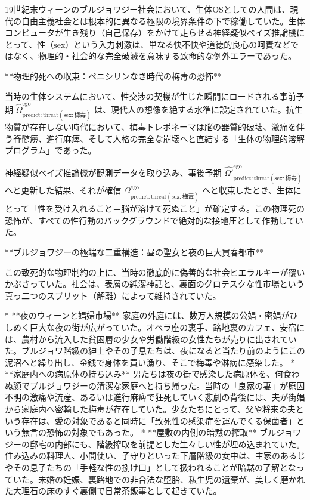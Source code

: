 19世紀末ウィーンのブルジョワジー社会において、生体OSとしての人間は、現代の自由主義社会とは根本的に異なる極限の境界条件の下で稼働していた。生体コンピュータが生き残り（自己保存）をかけて走らせる神経疑似ベイズ推論機にとって、性（$\mathrm{sex}$）という入力刺激は、単なる快不快や道徳的良心の呵責などではなく、物理的・社会的な完全破滅を意味する致命的な例外エラーであった。

**物理的死への収束：ペニシリンなき時代の梅毒の恐怖**

当時の生体システムにおいて、性交渉の契機が生じた瞬間にロードされる事前予期 $\hat{\Omega}_{\mathrm{predict:threat}(\mathrm{sex}:\text{梅毒})}^{\mathrm{ego}}$ は、現代人の想像を絶する水準に設定されていた。抗生物質が存在しない時代において、梅毒トレポネーマは脳の器質的破壊、激痛を伴う脊髄癆、進行麻痺、そして人格の完全な崩壊へと直結する「生体の物理的溶解プログラム」であった。

神経疑似ベイズ推論機が観測データを取り込み、事後予期 $\hat{\Omega'}_{\mathrm{predict:threat}(\mathrm{sex}:\text{梅毒})}^{\mathrm{ego}}$ へと更新した結果、それが確信 $\Omega_{\mathrm{predict:threat}(\mathrm{sex}:\text{梅毒})}^{\mathrm{ego}}$ へと収束したとき、生体にとって「性を受け入れること＝脳が溶けて死ぬこと」が確定する。この物理死の恐怖が、すべての性行動のバックグラウンドで絶対的な接地圧として作動していた。

**ブルジョワジーの極端な二重構造：昼の聖女と夜の巨大買春都市**

この致死的な物理制約の上に、当時の徹底的に偽善的な社会ヒエラルキーが覆いかぶさっていた。社会は、表層の純潔神話と、裏面のグロテスクな性市場という真っ二つのスプリット（解離）によって維持されていた。

* **夜のウィーンと娼婦市場**
家庭の外庭には、数万人規模の公娼・密娼がひしめく巨大な夜の街が広がっていた。オペラ座の裏手、路地裏のカフェ、安宿には、農村から流入した貧困層の少女や労働階級の女性たちが売りに出されていた。ブルジョワ階級の紳士やその子息たちは、夜になると当たり前のようにこの泥沼へと繰り出し、金銭で身体を買い漁り、そこで梅毒や淋病に感染した。
* **家庭内への病原体の持ち込み**
男たちは夜の街で感染した病原体を、何食わぬ顔でブルジョワジーの清潔な家庭へと持ち帰った。当時の「良家の妻」が原因不明の激痛や流産、あるいは進行麻痺で狂死していく悲劇の背後には、夫が街娼から家庭内へ密輸した梅毒が存在していた。少女たちにとって、父や将来の夫という存在は、愛の対象であると同時に「致死性の感染症を運んでくる保菌者」という無言の恐怖の対象でもあった。
* **屋敷の内側の暗黙の搾取**
ブルジョワジーの邸宅の内部にも、階級搾取を前提とした生々しい性が埋め込まれていた。住み込みの料理人、小間使い、子守りといった下層階級の女中は、主家のあるじやその息子たちの「手軽な性の捌け口」として扱われることが暗黙の了解となっていた。未婚の妊娠、裏路地での非合法な堕胎、私生児の遺棄が、美しく磨かれた大理石の床のすぐ裏側で日常茶飯事として起きていた。

